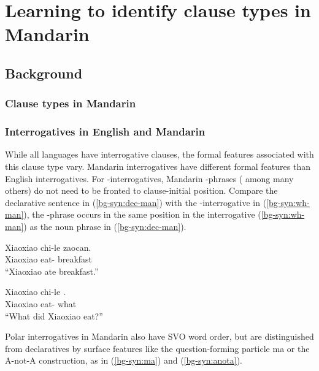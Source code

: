 \chapter{Learning to identify clause types in Mandarin}
\label{chap:man-cl}

\section{Background}
\subsection{Clause types in Mandarin}


\subsection{Interrogatives in English and Mandarin}\label{bg:syn}
	
\noindent While all languages have interrogative clauses, the formal features associated with this clause type vary. 
\noindent Mandarin interrogatives have different formal features than English interrogatives. For \twh-interrogatives, Mandarin \twh-phrases (\citealt{huang1982, cheng1991} among many others) do not need to be fronted to clause-initial position. Compare the declarative sentence in (\ref{bg-syn:dec-man}) with the \twh-interrogative in (\ref{bg-syn:wh-man}), the \twh-phrase  occurs in the same position in the interrogative (\ref{bg-syn:wh-man}) as the noun phrase  in (\ref{bg-syn:dec-man}). 


\vspace{-1.5ex} 
\noindent
\begin{minipage}[t]{0.45\linewidth}	
\gll Xiaoxiao	chi-le zaocan.\\
Xiaoxiao eat-\Asp{} breakfast \\
``Xiaoxiao ate breakfast.''
\eex
\end{minipage}
\hspace{0.5cm} %
\begin{minipage}[t]{0.5\linewidth} 
\gll Xiaoxiao	chi-le .\\
Xiaoxiao eat-\Asp{} what \\
``What did Xiaoxiao eat?''
\eex
\end{minipage}
\vspace{0.5ex}

\noindent 
Polar interrogatives in Mandarin also have SVO word order, but are distinguished from declaratives by surface features like the question-forming particle ma or the A-not-A construction, as in (\ref{bg-syn:ma}) and (\ref{bg-syn:anota}).

